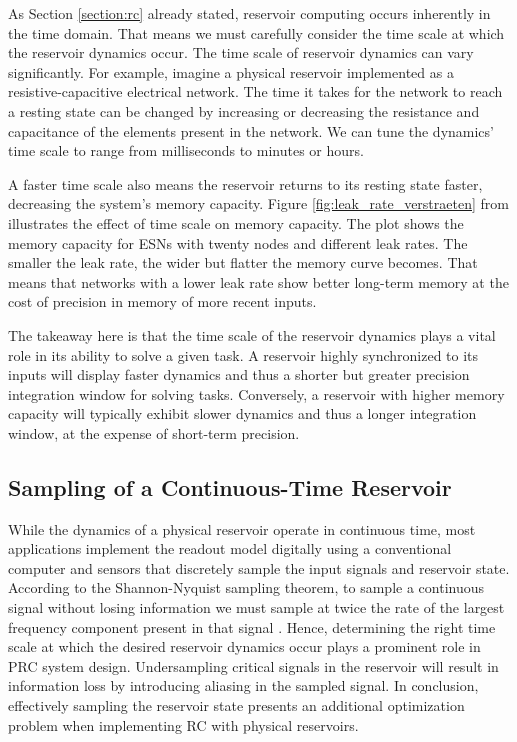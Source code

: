 
As Section \ref{section:rc} already stated, reservoir computing occurs inherently in the time domain.
That means we must carefully consider the time scale at which the reservoir dynamics occur.
The time scale of reservoir dynamics can vary significantly. 
For example, imagine a physical reservoir implemented as a resistive-capacitive electrical network. 
The time it takes for the network to reach a resting state can be changed by increasing or decreasing the resistance and capacitance of the elements present in the network.
We can tune the dynamics' time scale to range from milliseconds to minutes or hours.


A faster time scale also means the reservoir returns to its resting state faster, decreasing the system's memory capacity. Figure \ref{fig:leak_rate_verstraeten} from \citet{verstraeten_towards_2009} illustrates the effect of time scale on memory capacity.
The plot shows the memory capacity for ESNs with twenty nodes and different leak rates. The smaller the leak rate, the wider but flatter the memory curve becomes.
That means that networks with a lower leak rate show better long-term memory at the cost of precision in memory of more recent inputs.




The takeaway here is that the time scale of the reservoir dynamics plays a vital role in its ability to solve a given task. 
A reservoir highly synchronized to its inputs will display faster dynamics and thus a shorter but greater precision integration window for solving tasks.
Conversely, a reservoir with higher memory capacity will typically exhibit slower dynamics and thus a longer integration window, at the expense of short-term precision.


\subsection{Sampling of a Continuous-Time Reservoir}

While the dynamics of a physical reservoir operate in continuous time, most applications implement the readout model digitally using a conventional computer and sensors that discretely sample the input signals and reservoir state.
According to the Shannon-Nyquist sampling theorem, to sample a continuous signal without losing information we must sample at twice the rate of the largest frequency component present in that signal \citep{shannon_communication_1949}.
Hence, determining the right time scale at which the desired reservoir dynamics occur plays a prominent role in PRC system design. 
Undersampling critical signals in the reservoir will result in information loss by introducing aliasing in the sampled signal. 
In conclusion, effectively sampling the reservoir state presents an additional optimization problem when implementing RC with physical reservoirs.


